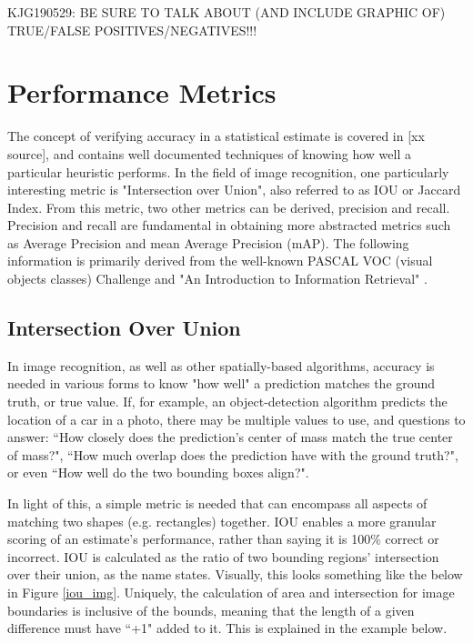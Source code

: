 

KJG190529: BE SURE TO TALK ABOUT (AND INCLUDE GRAPHIC OF) TRUE/FALSE POSITIVES/NEGATIVES!!!

\section{Performance Metrics}
The concept of verifying accuracy in a statistical estimate is covered in [xx source], and contains well documented techniques of knowing how well a particular heuristic performs. In the field of image recognition, one particularly interesting metric is "Intersection over Union", also referred to as IOU or Jaccard Index. From this metric, two other metrics can be derived, precision and recall. Precision and recall are fundamental in obtaining more abstracted metrics such as Average Precision and mean Average Precision (mAP). The following information is primarily derived from the well-known PASCAL VOC (visual objects classes) Challenge \cite{everingham_pascal_2010} and "An Introduction to Information Retrieval" \cite{Manning:2008:IIR:1394399}.

\subsection{Intersection Over Union}
In image recognition, as well as other spatially-based algorithms, accuracy is needed in various forms to know "how well" a prediction matches the ground truth, or true value. If, for example, an object-detection algorithm predicts the location of a car in a photo, there may be multiple values to use, and questions to answer: ``How closely does the prediction's center of mass match the true center of mass?", ``How much overlap does the prediction have with the ground truth?", or even ``How well do the two bounding boxes align?". 

In light of this, a simple metric is needed that can encompass all aspects of matching two shapes (e.g. rectangles) together. IOU enables a more granular scoring of an estimate's performance, rather than saying it is 100\% correct or incorrect. IOU is calculated as the ratio of two bounding regions' intersection over their union, as the name states. Visually, this looks something like the below in Figure \ref{iou_img}. Uniquely, the calculation of area and intersection for image boundaries is inclusive of the bounds, meaning that the length of a given difference must have ``+1" added to it. This is explained in the example below.

